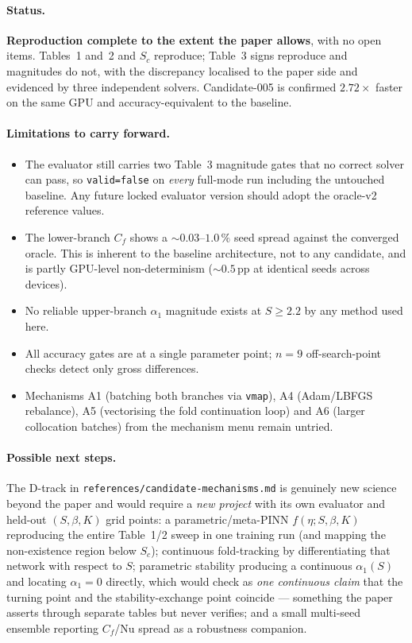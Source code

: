 \documentclass[11pt,a4paper]{article}
\newcommand{\code}[1]{\texttt{\small #1}}
\newcommand{\pct}{\,\%}
\begin{document}
\paragraph{Status.} \textbf{Reproduction complete to the extent the paper allows}, with no
open items. Tables~1 and~2 and $S_c$ reproduce; Table~3 signs reproduce and magnitudes do
not, with the discrepancy localised to the paper side and evidenced by three independent
solvers. Candidate-005 is confirmed $2.72\times$ faster on the same GPU and
accuracy-equivalent to the baseline.

\paragraph{Limitations to carry forward.}
\begin{itemize}[leftmargin=1.4em,itemsep=1pt]
  \item The evaluator still carries two Table~3 magnitude gates that no correct solver can
        pass, so \code{valid=false} on \emph{every} full-mode run including the untouched
        baseline. Any future locked evaluator version should adopt the oracle-v2 reference
        values.
  \item The lower-branch $C_f$ shows a ${\sim}0.03$--$1.0\pct$ seed spread against the
        converged oracle. This is inherent to the baseline architecture, not to any
        candidate, and is partly GPU-level non-determinism (${\sim}0.5$\,pp at identical
        seeds across devices).
  \item No reliable upper-branch $\alpha_1$ magnitude exists at $S\geq2.2$ by any method
        used here.
  \item All accuracy gates are at a single parameter point; $n=9$ off-search-point checks
        detect only gross differences.
  \item Mechanisms A1 (batching both branches via \code{vmap}), A4 (Adam/LBFGS rebalance),
        A5 (vectorising the fold continuation loop) and A6 (larger collocation batches)
        from the mechanism menu remain untried.
\end{itemize}

\paragraph{Possible next steps.} The D-track in
\code{references/candidate-mechanisms.md} is genuinely new science beyond the paper and
would require a \emph{new project} with its own evaluator and held-out $(S,\beta,K)$ grid
points: a parametric/meta-PINN $f(\eta;S,\beta,K)$ reproducing the entire Table~1/2 sweep in
one training run (and mapping the non-existence region below $S_c$); continuous
fold-tracking by differentiating that network with respect to $S$; parametric stability
producing a continuous $\alpha_1(S)$ and locating $\alpha_1=0$ directly, which would check
as \emph{one continuous claim} that the turning point and the stability-exchange point
coincide --- something the paper asserts through separate tables but never verifies; and a
small multi-seed ensemble reporting $C_f$/$\mathrm{Nu}$ spread as a robustness companion.
\end{document}
